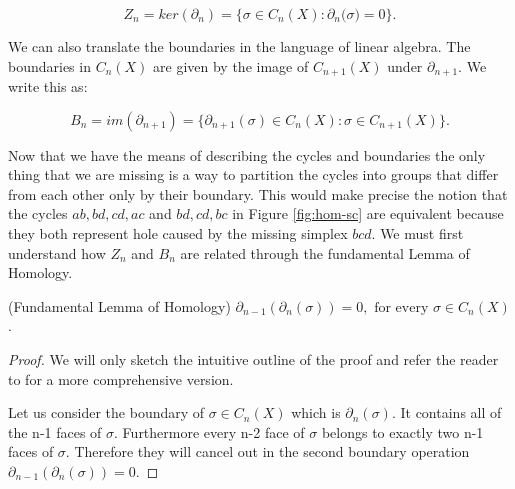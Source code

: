 $$ Z_n = ker(\partial_n) = \Big\{\sigma \in C_{n}(X): \partial_n\big(\sigma\big) = 0 \Big\}. $$

We can also translate the boundaries in the language of linear algebra. The boundaries in $C_n(X)$ are given by the image of $C_{n+1}(X)$ under $\partial_{n+1}$. We write this as:


$$ B_n = im(\partial_{n+1}) = \Big\{\partial_{n+1}(\sigma) \in C_{n}(X): \sigma \in C_{n+1}(X) \Big\}. $$




Now that we have the means of describing the cycles and boundaries the only thing that we are missing is a way to partition the cycles into groups that differ from each other only by their boundary. This would make precise the notion that the cycles $ab, bd, cd, ac$ and $bd, cd, bc$ in Figure \ref{fig:hom-sc} are equivalent because they both represent hole caused by the missing simplex $bcd$. We must first understand how $Z_n$ and $B_n$ are related through the fundamental Lemma of Homology.

\begin{lem} (Fundamental Lemma of Homology) $\partial_{n-1}(\partial_n(\sigma)) = 0, \text{ for every } \sigma \in C_{n}(X)$. \end{lem}

\begin{proof}
    We will only sketch the intuitive outline of the proof and refer the reader to \cite[p. 105]{algebraic-topology} for a more comprehensive version.

    Let us consider the boundary of $\sigma \in C_n(X)$ which is $\partial_n(\sigma)$. It contains all of the n-1 faces of $\sigma$. Furthermore every n-2 face of $\sigma$ belongs to exactly two n-1 faces of $\sigma$. Therefore they will cancel out in the second boundary operation $\partial_{n-1}(\partial_n(\sigma)) = 0$.
\end{proof}


